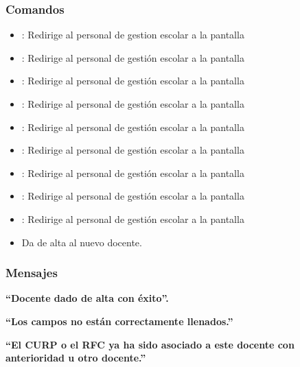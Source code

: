 \subsubsection{Comandos}
\begin{itemize}
	\item {}: Redirige al personal de gestion escolar a la pantalla 
	
	\item {}: Redirige al personal de gestión escolar a la pantalla 
	\item {}: Redirige al personal de gestión escolar a la pantalla 
	
	\item {}: Redirige al personal de gestión escolar a la pantalla 
	\item {}: Redirige al personal de gestión escolar a la pantalla 
	
	\item {}: Redirige al personal de gestión escolar a la pantalla 
	\item {}: Redirige al personal de gestión escolar a la pantalla 
	
	\item {}: Redirige al personal de gestión escolar a la pantalla 
	\item {}: Redirige al personal de gestión escolar a la pantalla 
	
    \item {} Da de alta al nuevo docente.
\end{itemize}

\subsubsection{Mensajes}

\begin{Citemize}
    \item {\bf ``Docente dado de alta con éxito''.}
    \item {\bf ``Los campos no están correctamente llenados.''}
    \item {\bf ``El CURP o el RFC ya ha sido asociado a este docente con anterioridad u otro docente.''}
\end{Citemize}

